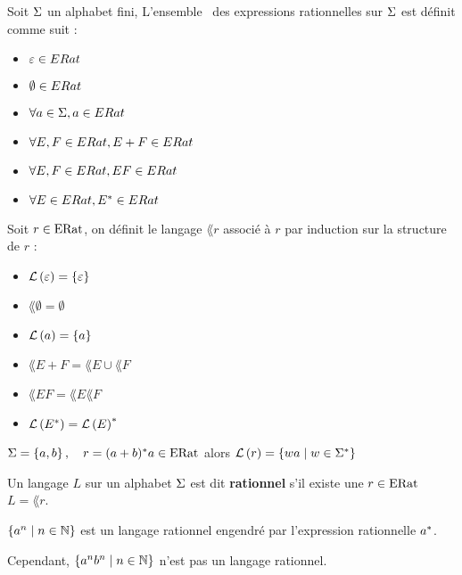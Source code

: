 \begin{definition}
	Soit $\Sigma$ un alphabet fini, L'ensemble \eratsym \ des expressions rationnelles sur $\Sigma$ est définit comme suit :
	\begin{itemize}
		\item $\varepsilon \in ERat$
		\item $\emptyset \in ERat$
		\item $\forall a \in \Sigma, a \in ERat$
		\item $\forall E, F \in ERat, E + F \in ERat$
		\item $\forall E, F \in ERat, EF \in ERat$
		\item $\forall E \in ERat, E^{*} \in ERat$
	\end{itemize}
\end{definition}

\begin{definition}
	Soit $r \in \text{ERat}$, on définit le langage $\lang r$ associé à $r$ par induction sur la structure de $r$ :
	\begin{itemize}
		\item $\mathcal{L}\left(\varepsilon\right) = \left\{\varepsilon\right\}$
		\item $\lang \emptyset = \emptyset$
		\item $\mathcal{L}\left(a\right) = \left\{a\right\}$
		\item $\lang {E + F} = \lang E \cup \lang F$
		\item $\lang {EF} = \lang E \lang F$
		\item $\mathcal{L}\left(E^{*}\right) = \mathcal{L}\left(E\right)^{*}$
	\end{itemize}
\end{definition}

\begin{exemple}
	$ \Sigma = \left\{a, b\right\}, \quad r = (a + b)^{*} a \in \text{ERat} $ alors
	$ \mathcal{L}\left(r\right) = \left\{wa \mid w \in \Sigma^{*}\right\} $
\end{exemple}


\begin{definition}
	Un langage $L$ sur un alphabet $\Sigma$ est dit \textbf{rationnel} s'il existe une \exprat $r \in \text{ERat}$ \tlq $L = \lang r$.

\end{definition}

\begin{exemple}
	$\left\{a^n \mid n \in \mathbb{N}\right\}$ est un langage rationnel engendré par l'expression rationnelle $a^{*}$.

	Cependant, $\left\{a^n b^n \mid n \in \mathbb{N}\right\}$ n'est pas un langage rationnel.
\end{exemple}


